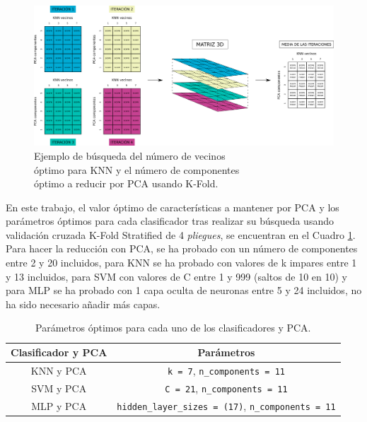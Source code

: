\begin{figure} [h!]
  \begin{center}
    \includegraphics[width=16cm]{figs/KFold_KNN_PCA.png}
  \end{center}
  \captionsetup{justification=centering}
  \caption{Ejemplo de búsqueda del número de vecinos\\
  óptimo para KNN y el número de componentes\\
  óptimo a reducir por PCA usando K-Fold.}
  \label{fig:kfold_KNN_PCA}
\end{figure}

En este trabajo, el valor óptimo de características a mantener por PCA y los parámetros óptimos para cada clasificador tras realizar su búsqueda usando validación cruzada K-Fold Stratified de 4 \textit{pliegues}, se encuentran en el Cuadro \ref{cuadro:parametros_optimos}. Para hacer la reducción con PCA, se ha probado con un número de componentes entre 2 y 20 incluidos, para KNN se ha probado con valores de k impares entre 1 y 13 incluidos, para SVM con valores de C entre 1 y 999 (saltos de 10 en 10) y para MLP se ha probado con 1 capa oculta de neuronas entre 5 y 24 incluidos, no ha sido necesario añadir más capas.\\

\begin{table}[H]
\begin{center}
\begin{tabular}{|c|c|}
     \hline
    \textbf{Clasificador y PCA} & \textbf{Parámetros} \\
    \hline
     KNN y PCA & \verb|k = 7|, \verb|n_components = 11|\\
     SVM y PCA & \verb|C = 21|, \verb|n_components = 11|\\
     MLP y PCA & \verb|hidden_layer_sizes = (17)|, \verb|n_components = 11|\\
     \hline
 \end{tabular}
 \captionsetup{justification=centering}
\caption{Parámetros óptimos para cada uno de los clasificadores y PCA.}
\label{cuadro:parametros_optimos}
\end{center}
\end{table}

